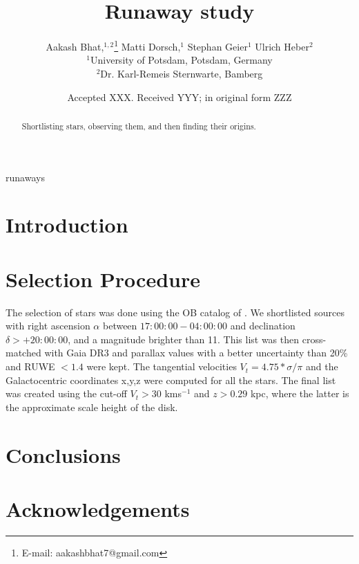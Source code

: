 \documentclass[fleqn,usenatbib]{mnras}
\title[Ondrejov]{Runaway study}
\author[Aakash Bhat et al.]{
Aakash Bhat,$^{1,2}$\thanks{E-mail: aakashbhat7@gmail.com}
Matti Dorsch,$^{1}$
Stephan Geier$^{1}$
Ulrich Heber$^{2}$
\\
$^{1}$University of Potsdam, Potsdam, Germany\\
$^{2}$Dr. Karl-Remeis Sternwarte, Bamberg
}
\date{Accepted XXX. Received YYY; in original form ZZZ}
\begin{document}
\label{firstpage}
\pagerange{\pageref{firstpage}--\pageref{lastpage}}
\maketitle

\begin{abstract}
Shortlisting stars, observing them, and then finding their origins.
\end{abstract}

\begin{keywords}
runaways
\end{keywords}



\section{Introduction}


\section{Selection Procedure}

The selection of stars was done using the OB catalog of \citet{2003AJ....125.2531R}. We shortlisted sources with right ascension $\alpha$ between $17:00:00-04:00:00$ and declination $\delta>+20:00:00$, and a magnitude brighter than 11. This list was then cross-matched with Gaia DR3 and parallax values with a better uncertainty than 20\% and RUWE $<1.4$ were kept. The tangential velocities $V_{t}=4.75*\sigma/\pi$ and the Galactocentric coordinates x,y,z were computed for all the stars. The final list was created using the cut-off $V_{t}>30$ kms$^{-1}$ and $z>0.29$ kpc, where the latter is the approximate scale height of the disk.


\section{Conclusions}



\section*{Acknowledgements}
\end{document}

